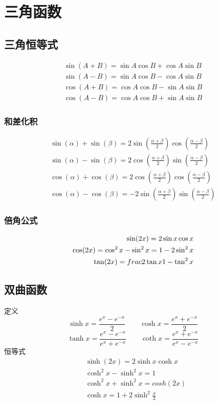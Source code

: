 \section{三角函数}
\subsection{三角恒等式}
\begin{align}
    \sin(A+B)= \sin A\cos B+\cos A\sin B\\
    \sin(A-B)= \sin A\cos B-\cos A\sin B\\
    \cos(A+B)= \cos A\cos B-\sin A\sin B\\
    \cos(A-B)= \cos A\cos B+\sin A\sin B
\end{align}
\subsubsection{和差化积}
\begin{align}
    \sin(\alpha)+\sin(\beta)=2\sin\left(\frac{\alpha+\beta}{2}\right)\cos\left(\frac{\alpha-\beta}{2}\right)\\
    \sin(\alpha)-\sin(\beta)=2\cos \left(\frac{\alpha+\beta}{2}\right)\sin\left(\frac{\alpha-\beta}{2}\right)\\
    \cos(\alpha)+\cos(\beta)=2\cos \left(\frac{\alpha+\beta}{2}\right)\cos\left(\frac{\alpha-\beta}{2}\right)\\
    \cos(\alpha)-\cos(\beta)=-2\sin \left(\frac{\alpha+\beta}{2}\right)\sin\left(\frac{\alpha-\beta}{2}\right)
\end{align}

\subsubsection{倍角公式}
\begin{displaymath}
    \centering
    \begin{split}
        \sin(2x)=2\sin x\cos x\\
        \cos(2x)=\cos^2x-\sin^2x=1-2\sin^2 x\\
        \tan(2x)=frac{2\tan x}{1-\tan^2x}
    \end{split}
\end{displaymath}
\subsection{双曲函数}
定义
$$\sinh x = \frac{e^x-e^{-x}}{2}\qquad \cosh x = \frac{e^x+e^{-x}}{2}$$
$$\tanh x = \frac{e^x-e^{-x}}{e^x+e^{-x}}\qquad \coth x = \frac{e^x+e^{-x}}{e^x-e^{-x}}$$
恒等式
\begin{align}
&\sinh (2x) = 2\sinh x\cosh x \label{eq:hyperbolic_functions_1} \\
&\cosh^2x-\sinh^2x = 1 \label{eq:hyperbolic_functions_2} \\
&\cosh^2x+\sinh^2x = cosh (2x) \label{eq:hyperbolic_functions_3} \\
&\cosh x = 1+2\sinh^2\frac{x}{2} \label{eq:hyperbolic_functions_4}
\end{align}
